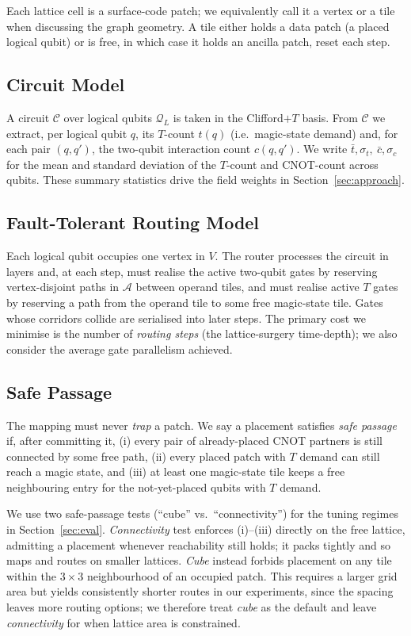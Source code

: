 \documentclass[10pt,conference]{IEEEtran}
\theoremstyle{definition}
\theoremstyle{remark}
\newcommand{\A}{\mathcal{A}}            %
\newcommand{\C}{\mathcal{C}}            %
\newcommand{\Q}{\mathcal{Q}}            %
\begin{document}
Each lattice cell is a surface-code patch; we equivalently call it a vertex or a
tile when discussing the graph geometry. A tile either holds a data patch (a
placed logical qubit) or is free, in which case it holds an ancilla patch, reset
each step.

\subsection{Circuit Model}

A circuit $\C$ over logical qubits $\Q_L$ is taken in the Clifford$+T$ basis.
From $\C$ we extract, per logical qubit $q$, its $T$-count $t(q)$ (i.e.\ magic-state demand) 
and, for each pair $(q,q')$, the
two-qubit interaction count $c(q,q')$. We write $\bar t,\sigma_t,\ \bar c,\sigma_c$ for the mean
and standard deviation of the $T$-count and CNOT-count across qubits.
These summary statistics drive the field weights in Section~\ref{sec:approach}.

\subsection{Fault-Tolerant Routing Model}

Each logical qubit occupies one vertex in $V$. The
router processes the circuit in layers and, at each step, must realise the
active two-qubit gates by reserving vertex-disjoint paths in $\A$ between
operand tiles, and must realise active $T$ gates by reserving a path from the
operand tile to some free magic-state tile. Gates whose corridors collide are
serialised into later steps. The primary cost we minimise is the number of
\emph{routing steps} (the lattice-surgery time-depth); we also consider the
average gate parallelism achieved.

\subsection{Safe Passage}

The mapping must never \emph{trap} a patch.
We say a placement satisfies \emph{safe passage} if, after committing it,
(i) every pair of already-placed CNOT partners is still connected by some free
path, (ii) every placed patch with $T$ demand can still reach a magic
state, and (iii) at least one magic-state tile keeps a free neighbouring entry
for the not-yet-placed qubits with $T$ demand. 

We use two safe-passage tests (``cube'' vs.\
``connectivity'') for the tuning regimes in Section~\ref{sec:eval}.
\emph{Connectivity} test enforces (i)--(iii) directly on the free lattice,
admitting a placement whenever reachability still holds; it packs tightly and so
maps and routes on smaller lattices. \emph{Cube} instead forbids placement on any tile 
within the $3\times3$ neighbourhood of an occupied patch. This requires a larger grid
area but yields consistently shorter routes in our experiments, since the
spacing leaves more routing options; we therefore treat
\emph{cube} as the default and leave \emph{connectivity} for when lattice
area is constrained.
\end{document}
